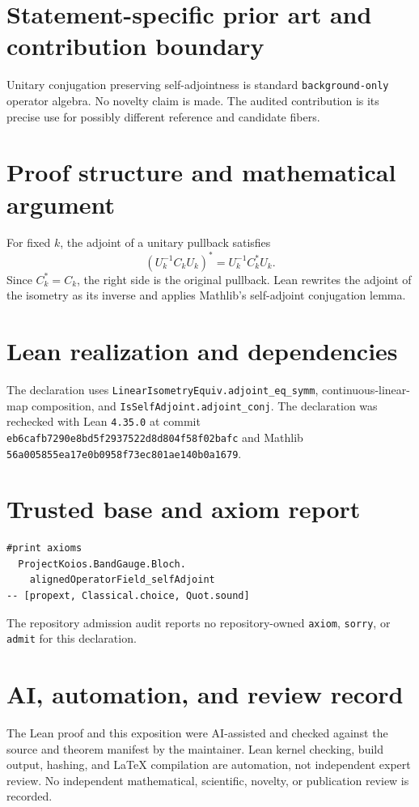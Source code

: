\documentclass[11pt]{article}
\begin{document}
\section{Statement-specific prior art and contribution boundary}
Unitary conjugation preserving self-adjointness is standard \texttt{background-only} operator algebra.  No novelty claim is made.  The audited contribution is its precise use for possibly different reference and candidate fibers.

\section{Proof structure and mathematical argument}
For fixed $k$, the adjoint of a unitary pullback satisfies
\[
 (U_k^{-1}C_kU_k)^*=U_k^{-1}C_k^*U_k.
\]
Since $C_k^*=C_k$, the right side is the original pullback.  Lean rewrites the adjoint of the isometry as its inverse and applies Mathlib's self-adjoint conjugation lemma.

\section{Lean realization and dependencies}
The declaration uses \texttt{LinearIsometryEquiv.adjoint\_eq\_symm}, continuous-linear-map composition, and \texttt{IsSelfAdjoint.adjoint\_conj}.  The declaration was rechecked with Lean \texttt{4.35.0} at commit \texttt{eb6cafb7290e8bd5f2937522d8d804f58f02bafc} and Mathlib \texttt{56a005855ea17e0b0958f73ec801ae140b0a1679}.

\section{Trusted base and axiom report}
\begin{verbatim}
#print axioms
  ProjectKoios.BandGauge.Bloch.
    alignedOperatorField_selfAdjoint
-- [propext, Classical.choice, Quot.sound]
\end{verbatim}
The repository admission audit reports no repository-owned \texttt{axiom}, \texttt{sorry}, or
\texttt{admit} for this declaration.

\section{AI, automation, and review record}
The Lean proof and this exposition were AI-assisted and checked against the source and theorem
manifest by the maintainer.  Lean kernel checking, build output, hashing, and LaTeX compilation are
automation, not independent expert review.  No independent mathematical, scientific, novelty, or
publication review is recorded.
\end{document}
